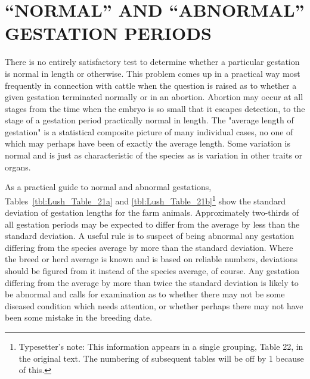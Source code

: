 \section*{``NORMAL'' AND ``ABNORMAL'' GESTATION PERIODS}

There is no entirely satisfactory test to determine whether a particular
gestation is normal in length or otherwise. This problem comes up
in a practical way most frequently in connection with cattle when the
question is raised as to whether a given gestation terminated normally
or in an abortion. Abortion may occur at all stages from the time when
the embryo is so small that it escapes detection, to the stage of a gestation
period practically normal in length. The "average length of gestation"
is a statistical composite picture of many individual cases, no one
of which may perhaps have been of exactly the average length. Some
variation is normal and is just as characteristic of the species as is variation
in other traits or organs.

As a practical guide to normal and abnormal gestations,
Tables~\ref{tbl:Lush_Table_21a} and
\ref{tbl:Lush_Table_21b}\footnote{Typesetter's note: This information appears in a single grouping,
Table 22, in the original text. The numbering of subsequent tables will be
off by 1 because of this.} show the standard deviation of gestation
lengths for the farm animals. Approximately two-thirds of all gestation
periods may be expected to differ from the average by less than the
standard deviation. A useful rule is to suspect of being abnormal any
gestation differing from the species average by more than the standard
deviation. Where the breed or herd average is known and is based on
reliable numbers, deviations should be figured from it instead of the
species average, of course. Any gestation differing from the average by
more than twice the standard deviation is likely to be abnormal and calls
for examination as to whether there may not be some diseased condition
which needs attention, or whether perhaps there may not have been some
mistake in the breeding date.

